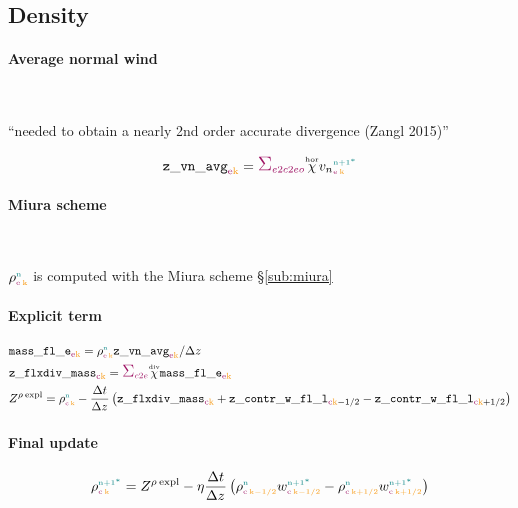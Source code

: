 \clearpage
\subsection{Density}
\label{sub:density}

\paragraph{Average normal wind}\

``needed to obtain a nearly 2nd order accurate divergence (Zangl 2015)''

\begin{equation}
  \zvnavg_{\e\k} = \sum_{\offProv{e2c2eo}} \Whor \vn{\n+1^*}{\e}{\k}
\end{equation}

\paragraph{Miura scheme}\

$\density{\n}{\e}{\k}$ is computed with the Miura scheme \S\ref{sub:miura}

\paragraph{Explicit term}

\begin{align}
  & \massfle_{\e\k} = \density{\n}{\e}{\k} \zvnavg_{\e\k} / \Dz{} \\
	& \zflxdivmass_{\c\k} = \sum_{\offProv{c2e}} \Cdiv \massfle_{\e\k} \\
  & \Zdensityexpl = \density{\n}{\c}{\k} - \frac{\Dt}{\Dz{}}\left( \zflxdivmass_{\c\k} + \zcontrwfll_{\c\k-1/2} - \zcontrwfll_{\c\k+1/2}\right)
\end{align}

\paragraph{Final update}

\begin{equation}
  \density{\n+1^*}{\c}{\k} = \Zdensityexpl - \WtimeVWind \frac{\Dt}{\Dz{}} \left(\density{\n}{\c}{\k-1/2} \w{\n+1^*}{\c}{\k-1/2} - \density{\n}{\c}{\k+1/2} \w{\n+1^*}{\c}{\k+1/2}\right)
\end{equation}
